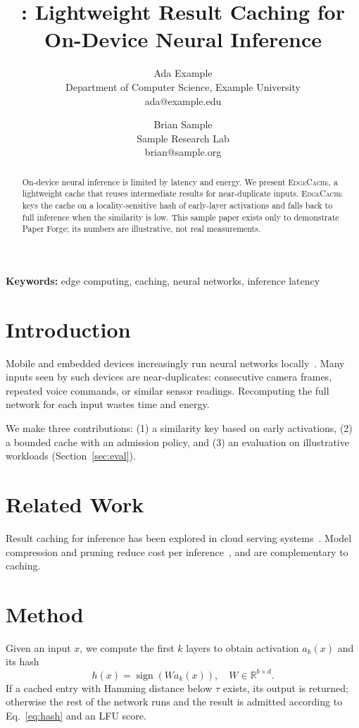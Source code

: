 \documentclass[11pt]{article}
\title{\method: Lightweight Result Caching for On-Device Neural Inference}
\author{Ada Example\\ Department of Computer Science, Example University\\ ada@example.edu
\and Brian Sample\\ Sample Research Lab\\ brian@sample.org}
\date{}
\newcommand{\method}{\textsc{EdgeCache}}
\begin{document}
\maketitle

\begin{abstract}
On-device neural inference is limited by latency and energy. We present \method{}, a lightweight cache
that reuses intermediate results for near-duplicate inputs. \method{} keys the cache on a locality-sensitive
hash of early-layer activations and falls back to full inference when the similarity is low. This sample
paper exists only to demonstrate Paper Forge; its numbers are illustrative, not real measurements.
\end{abstract}

\noindent\textbf{Keywords:} edge computing, caching, neural networks, inference latency

\section{Introduction}
\label{sec:intro}
Mobile and embedded devices increasingly run neural networks locally~\citep{lane2015early}. Many inputs seen by
such devices are near-duplicates: consecutive camera frames, repeated voice commands, or similar sensor
readings. Recomputing the full network for each input wastes time and energy.

We make three contributions: (1) a similarity key based on early activations, (2) a bounded cache with an
admission policy, and (3) an evaluation on illustrative workloads (Section~\ref{sec:eval}).

\section{Related Work}
Result caching for inference has been explored in cloud serving systems~\citep{crankshaw2017clipper}.
Model compression and pruning reduce cost per inference~\citep{han2016deep}, and are complementary to caching.

\section{Method}
\label{sec:method}
Given an input $x$, we compute the first $k$ layers to obtain activation $a_k(x)$ and its hash
\begin{equation}
h(x) = \operatorname{sign}(W a_k(x)), \quad W \in \mathbb{R}^{b \times d}.
\label{eq:hash}
\end{equation}
If a cached entry with Hamming distance below $\tau$ exists, its output is returned; otherwise the rest of the
network runs and the result is admitted according to Eq.~\eqref{eq:hash} and an LFU score.
\end{document}
